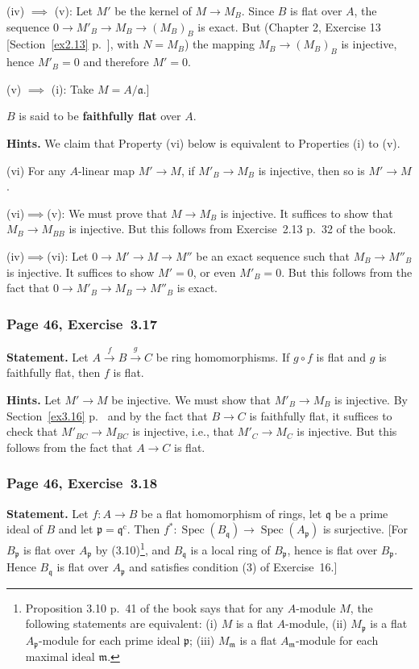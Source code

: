 \documentclass[12pt,letterpaper]{article}%
\newcommand{\oo}{\operatorname}\newcommand{\ooo}{\operatorname*}
\newcommand{\mf}{\mathfrak}
\newcommand{\aaa}{\mf a}
\newcommand{\mmm}{\mf m}
\newcommand{\ppp}{\mf p}
\newcommand{\qqq}{\mf q}
\newcommand{\Spec}{\operatorname{Spec}}\newcommand{\Sp}{\operatorname{Spec}}
\newcommand{\xr}{\xrightarrow}
\newcommand{\nn}{\noindent}
\begin{document}
\nn(iv) $\implies$ (v): Let $M'$ be the kernel of $M\to M_B$. Since $B$ is flat over $A$, the sequence $0\to M'_B\to M_B\to(M_B)_B$ is exact. But (Chapter 2, Exercise 13 [Section~\ref{ex2.13} p.~\pageref{ex2.13}], with $N=M_B$) the mapping $M_B\to(M_B)_B$ is injective, hence $M'_B=0$ and therefore $M'=0$.

\nn(v) $\implies$ (i): Take $M=A/\aaa$.]

\nn$B$ is said to be \textbf{faithfully flat} over $A$.

\nn\textbf{Hints.} We claim that Property (vi) below is equivalent to Properties (i) to (v).

\nn(vi) For any $A$-linear map $M'\to M$, if $M'_B\to M_B$ is injective, then so is $M'\to M$.

\nn(vi)$\implies$(v): We must prove that $M\to M_B$ is injective. It suffices to show that $M_B\to M_{BB}$ is injective. But this follows from Exercise~2.13 p.~32 of the book.

\nn(iv)$\implies$(vi): Let $0\to M'\to M\to M''$ be an exact sequence such that $M_B\to M''_B$ is injective. It suffices to show $M'=0$, or even $M'_B=0$. But this follows from the fact that $0\to M'_B\to M_B\to M''_B$ is exact.


\subsubsection{Page 46, Exercise~3.17}\label{ex3.17}%

\textbf{Statement.} Let $A\xr fB\xr gC$ be ring homomorphisms. If $g\circ f$ is flat and $g$ is faithfully flat, then $f$ is flat.

\nn\textbf{Hints.} Let $M'\to M$ be injective. We must show that $M'_B\to M_B$ is injective.  By Section~\ref{ex3.16} p.~\pageref{ex3.16} and by the fact that $B\to C$ is faithfully flat, it suffices to check that $M'_{BC}\to M_{BC}$ is injective, i.e., that $M'_C\to M_C$ is injective. But this follows from the fact that $A\to C$ is flat.

\subsubsection{Page 46, Exercise~3.18}%

\textbf{Statement.} Let $f:A\to B$ be a flat homomorphism of rings, let $\qqq$ be a prime ideal of $B$ and let $\ppp=\qqq^{\oo c}$. Then $f^*:\Spec(B_\qqq)\to\Spec(A_\ppp)$ is surjective. [For $B_\ppp$ is flat over $A_\ppp$ by (3.10)\footnote{Proposition 3.10 p.~41 of the book says that for any $A$-module $M$, the following statements are equivalent: (i) $M$ is a flat $A$-module, (ii) $M_\ppp$ is a flat $A_\ppp$-module for each prime ideal $\ppp$; (iii) $M_\mmm$ is a flat $A_\mmm$-module for each maximal ideal $\mmm$.}, and $B_\qqq$ is a local ring of $B_\ppp$, hence is flat over $B_\ppp$. Hence $B_\qqq$ is flat over $A_\ppp$ and satisfies condition (3) of Exercise~16.]
\end{document}
